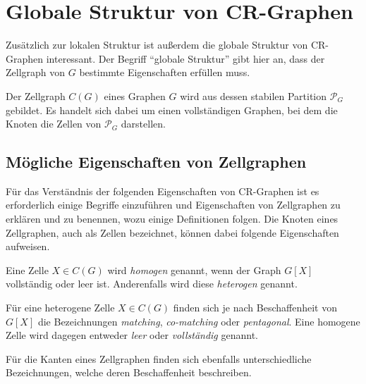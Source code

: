 \section{Globale Struktur von CR-Graphen}
\label{sec/struktur_global}


Zusätzlich zur lokalen Struktur ist außerdem die globale Struktur von CR-Graphen interessant.
Der Begriff \enquote{globale Struktur} gibt hier an, dass der Zellgraph von $G$ bestimmte Eigenschaften erfüllen muss.

\begin{Definition}
	Der Zellgraph $C(G)$ eines Graphen $G$ wird aus dessen stabilen Partition $\mathcal{P}_G$ gebildet.
	Es handelt sich dabei um einen vollständigen Graphen, bei dem die Knoten die Zellen von $\mathcal{P}_G$ darstellen.
\end{Definition}

\subsection{Mögliche Eigenschaften von Zellgraphen}
Für das Verständnis der folgenden Eigenschaften von CR-Graphen ist es erforderlich einige Begriffe einzuführen und Eigenschaften von Zellgraphen zu erklären und zu benennen, wozu einige Definitionen folgen.
Die Knoten eines Zellgraphen, auch als Zellen bezeichnet, können dabei folgende Eigenschaften aufweisen.

\begin{Definition}
	Eine Zelle $X\in C(G)$ wird \emph{homogen} genannt, wenn der Graph $G[X]$ vollständig oder leer ist. Anderenfalls wird diese \emph{heterogen} genannt.
\end{Definition}

\begin{Definition}
	Für eine heterogene Zelle $X\in C(G)$ finden sich je nach Beschaffenheit von $G[X]$ die Bezeichnungen \emph{matching}, \emph{co-matching} oder \emph{pentagonal}.
	Eine homogene Zelle wird dagegen entweder \emph{leer} oder \emph{vollständig} genannt.
\end{Definition}

Für die Kanten eines Zellgraphen finden sich ebenfalls unterschiedliche Bezeichnungen, welche deren Beschaffenheit beschreiben.

